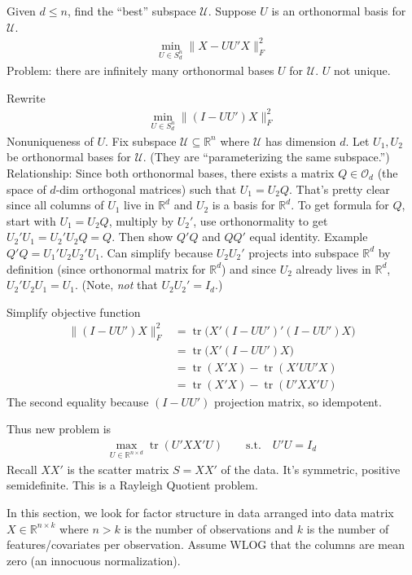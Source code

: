 \documentclass[12pt]{book}
\numberwithin{equation}{section} %
\theoremstyle{plain}
\theoremstyle{definition}
\theoremstyle{remark}
\newcommand{\trace}{\operatorname{tr}}
\newcommand{\calO}{\mathcal{O}}
\newcommand{\calU}{\mathcal{U}}
\newcommand{\R}{\mathbb{R}}
\newcommand{\Rn}{\mathbb{R}^n}
\begin{document}
Given $d\leq n$, find the ``best'' subspace $\calU$.
Suppose $U$ is an orthonormal basis for $\calU$.
\begin{align*}
  \min_{U\in S_d^n}
  \lVert X-UU'X\rVert_F^2
\end{align*}
Problem: there are infinitely many orthonormal bases $U$ for $\calU$.
$U$ not unique.

Rewrite
\begin{align*}
  \min_{U\in S_d^n}
  \lVert (I-UU')X\rVert_F^2
\end{align*}
Nonuniqueness of $U$.
Fix subspace $\calU\subseteq \Rn$ where $\calU$ has dimension $d$.
Let $U_1,U_2$ be orthonormal bases for $\calU$.
(They are ``parameterizing the same subspace.'')
Relationship:
Since both orthonormal bases, there exists a matrix $Q\in\calO_d$ (the
space of $d$-dim orthogonal matrices) such that $U_1=U_2Q$.
That's pretty clear since all columns of $U_1$ live in $\R^d$ and $U_2$
is a basis for $\R^d$.
To get formula for $Q$, start with $U_1=U_2Q$, multiply by $U_2'$, use
orthonormality to get $U_2'U_1=U_2'U_2Q=Q$.
Then show $Q'Q$ and $QQ'$ equal identity.
Example $Q'Q=U_1'U_2U_2'U_1$. Can simplify because $U_2U_2'$ projects
into subspace $\R^d$ by definition (since orthonormal matrix for $\R^d$)
and since $U_2$ already lives in $\R^d$, $U_2'U_2U_1=U_1$.
(Note, \emph{not} that $U_2U_2'=I_d$.)

Simplify objective function
\begin{align*}
  \lVert (I-UU')X\rVert_F^2
  &=
  \trace\big(
    X'(I-UU')'
    (I-UU')X
  \big)
  \\
  &=
  \trace\big(
    X' (I-UU')X
  \big)
  \\
  &= \trace(X'X)-\trace(X'UU'X)
  \\
  &= \trace(X'X)-\trace(U'XX'U)
\end{align*}
The second equality because $(I-UU')$ projection matrix, so idempotent.

Thus new problem is
\begin{align*}
  \max_{U\in\R^{n\times d}}
  \trace(U'XX'U)
  \qquad\text{s.t.}\quad
  U'U=I_d
\end{align*}
Recall $XX'$ is the scatter matrix $S=XX'$ of the data.
It's symmetric, positive semidefinite.
This is a Rayleigh Quotient problem.

In this section, we look for factor structure in data arranged into data
matrix $X\in\R^{n\times k}$ where $n>k$ is the number of observations
and $k$ is the number of features/covariates per observation.  Assume
WLOG that the columns are mean zero (an innocuous normalization).
\end{document}
